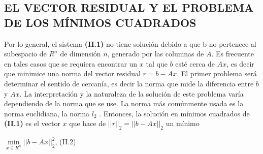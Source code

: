 \documentclass[twocolumn,twoside]{article}
\begin{document}
\subsection{EL VECTOR RESIDUAL Y EL PROBLEMA DE LOS M\'INIMOS CUADRADOS}

Por lo general, el sistema \textbf{(II.1)} no tiene soluci\'on debido a que b no pertenece al
subespacio de $R^n$ de dimensi\'on $n$, generado por las columnas de $A$. Es frecuente en tales
casos que se requiera encontrar un $x$ tal que $b$ est\'e cerca de $A x$, es decir que minimice
una norma del vector residual $r = b-A x$. El primer problema ser\'a determinar el sentido
de cercan\'ia, es decir la norma que mide la diferencia entre $b$ y $A x$. La interpretaci\'on
y la naturaleza de la soluci\'on de este problema var\'ia dependiendo de la norma que se
use. La norma m\'as com\'unmente usada es la norma euclidiana, la norma $l_2$ . Entonces, la
soluci\'on en m\'inimos cuadrados de \textbf{(II.1)} es el vector $x$ que hace de $||r||_2 = ||b - A x||_2$
un m\'inimo
\begin{center}
  $\min\limits_{x\in R^n}||b - A x||_2^2$, \hspace{2.5cm} (II.2)
\end{center}
\end{document}
